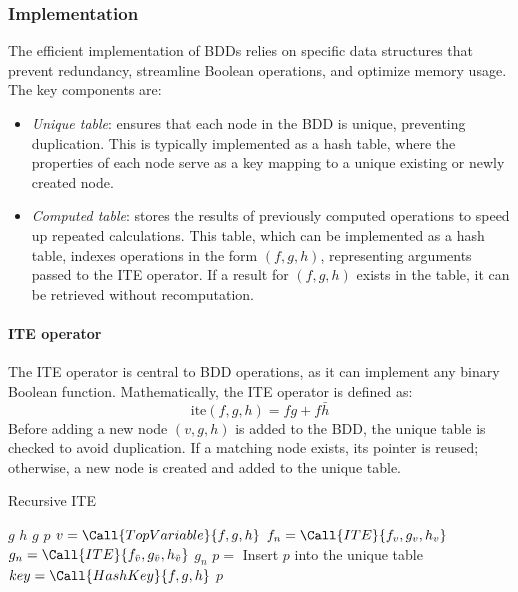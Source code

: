 \subsubsection{Implementation}
The efficient implementation of BDDs relies on specific data structures that prevent redundancy, streamline Boolean operations, and optimize memory usage. 
The key components are:
\begin{itemize}
    \item \textit{Unique table}: ensures that each node in the BDD is unique, preventing duplication. 
        This is typically implemented as a hash table, where the properties of each node serve as a key mapping to a unique existing or newly created node.
    \item \textit{Computed table}: stores the results of previously computed operations to speed up repeated calculations.
        This table, which can be implemented as a hash table, indexes operations in the form $(f,g,h)$, representing arguments passed to the ITE operator. 
        If a result for $(f,g,h)$ exists in the table, it can be retrieved without recomputation.
\end{itemize}

\paragraph*{ITE operator}
The ITE operator is central to BDD operations, as it can implement any binary Boolean function. 
Mathematically, the ITE operator is defined as:
\[\text{ite}(f,g,h)=fg+f\bar{h}\]
Before adding a new node $(v, g, h)$ is added to the BDD, the unique table is checked to avoid duplication. 
If a matching node exists, its pointer is reused; otherwise, a new node is created and added to the unique table.
\begin{algorithm}[H]
    \caption{Recursive ITE}
    \begin{algorithmic}
                \State \Return $g$
            \EndIf
                \State \Return $h$
            \EndIf
                \State \Return $g$
            \EndIf
                \State \Return $p$
            \EndIf
            \State $v = \Call{TopVariable}{f,g,h}$
            \State $f_n = \Call{ITE}{f_v, g_v, h_v}$
            \State $g_n = \Call{ITE}{f_{\bar{v}}, g_{\bar{v}}, h_{\bar{v}}}$
                \State \Return $g_n$
            \EndIf
                \State $p=$ 
                \State Insert $p$ into the unique table
            \EndIf
            \State $key= \Call{HashKey}{f, g, h}$
            \State {}
            \State \Return $p$
        \EndFunction
    \end{algorithmic}
\end{algorithm}

